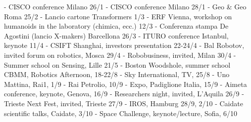 -          CISCO conference Milano 26/1
-          CISCO conference Milano 28/1
-          Geo \& Geo Roma 25/2
-          Lancio cartone Transformers 1/3
-          ERF Vienna, workshop on humanoids in the laboratory (chimica, ecc.) 12/3
-          Conferenza stampa De Agostini (lancio X-makers) Barcellona 26/3
-          ITURO conference Istanbul, keynote 11/4
-          CSIFT Shanghai, investors presentation 22-24/4
-          Bal Robotov, invited forum on robotics, Mosca 29/4
-          Robobusiness, invited, Milan 30/4
-          Summer school on Sensing, Lille 21/5
-          Boston Woodshole, summer school CBMM, Robotics Afternoon, 18-22/8
-          Sky International, TV, 25/8
-          Uno Mattina, Rai1, 1/9
-          Rai Petrolio, 10/9
-          Expo, Padiglione Italia, 15/9
-          Aimeta conference, keynote, Genova, 16/9
-          Researchers night, invited, L’Aquila 26/9
-          Trieste Next Fest, invited, Trieste 27/9
-          IROS, Hamburg 28/9, 2/10
-          Caidate scientific talks, Caidate, 3/10
-          Space Challenge, keynote/lecture, Sofia, 6/10

